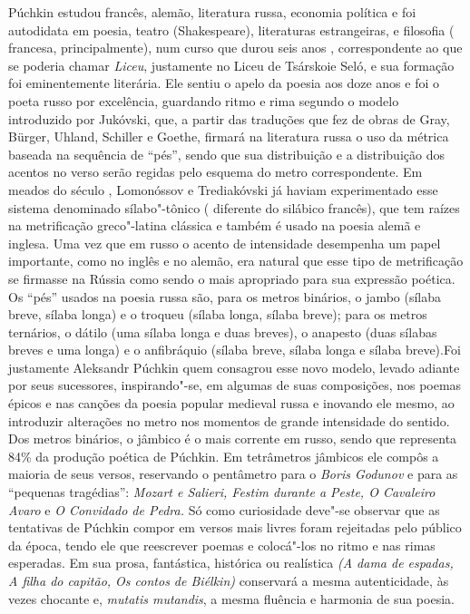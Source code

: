 Púchkin estudou francês, alemão, literatura russa, economia política e
foi autodidata em poesia, teatro (Shakespeare), literaturas
estrangeiras, e filosofia ( francesa, principalmente), num curso que
durou seis anos , correspondente ao que se poderia chamar \emph{Liceu},
justamente no Liceu de Tsárskoie Seló, e sua formação foi eminentemente
literária. Ele sentiu o apelo da poesia aos doze anos e foi o poeta
russo por excelência, guardando ritmo e rima segundo o modelo
introduzido por Jukóvski, que, a partir das traduções que fez de obras
de Gray, Bürger, Uhland, Schiller e Goethe, firmará na literatura russa
o uso da métrica baseada na sequência de ``pés'', sendo que sua
distribuição e a distribuição dos acentos no verso serão regidas pelo
esquema do metro correspondente. Em meados do século , Lomonóssov e
Trediakóvski já haviam experimentado esse sistema denominado
sílabo"-tônico ( diferente do silábico francês), que tem raízes na
metrificação greco"-latina clássica e também é usado na poesia alemã e
inglesa. Uma vez que em russo o acento de intensidade desempenha um
papel importante, como no inglês e no alemão, era natural que esse tipo
de metrificação se firmasse na Rússia como sendo o mais apropriado para
sua expressão poética. Os ``pés'' usados na poesia russa são, para os
metros binários, o jambo (sílaba breve, sílaba longa) e o troqueu
(sílaba longa, sílaba breve); para os metros ternários, o dátilo (uma
sílaba longa e duas breves), o anapesto (duas sílabas breves e uma
longa) e o anfibráquio (sílaba breve, sílaba longa e sílaba breve).Foi
justamente Aleksandr Púchkin quem consagrou esse novo modelo, levado
adiante por seus sucessores, inspirando"-se, em algumas de suas
composições, nos poemas épicos e nas canções da poesia popular medieval
russa e inovando ele mesmo, ao introduzir alterações no metro nos
momentos de grande intensidade do sentido. Dos metros binários, o
jâmbico é o mais corrente em russo, sendo que representa 84\% da
produção poética de Púchkin. Em tetrâmetros jâmbicos ele compôs a
maioria de seus versos, reservando o pentâmetro para o \emph{Boris
Godunov} e para as ``pequenas tragédias'': \emph{Mozart e Salieri,
Festim durante a Peste, O Cavaleiro Avaro} e \emph{O Convidado de
Pedra.} Só como curiosidade deve"-se observar que as tentativas de
Púchkin compor em versos mais livres foram rejeitadas pelo público da
época, tendo ele que reescrever poemas e colocá"-los no ritmo e nas rimas
esperadas. Em sua prosa, fantástica, histórica ou realística \emph{(A
dama de espadas, A filha do capitão, Os contos de Biélkin)} conservará a
mesma autenticidade, às vezes chocante e, \emph{mutatis mutandis}, a
mesma fluência e harmonia de sua poesia.

